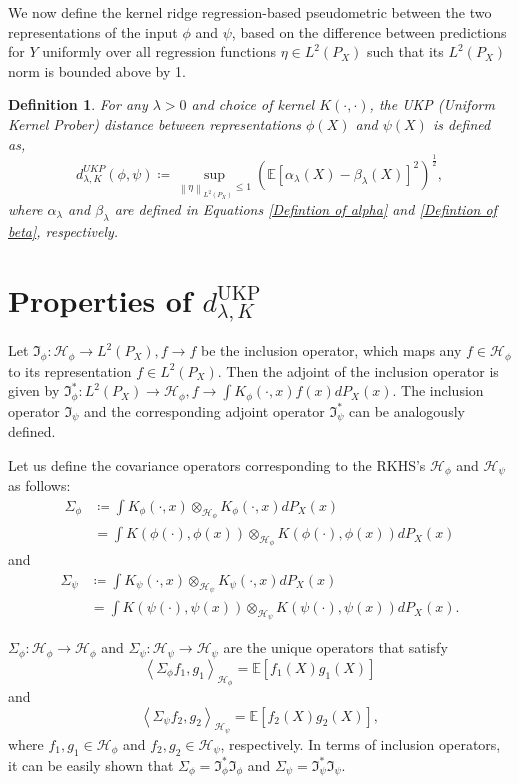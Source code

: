 \documentclass{article}
\theoremstyle{plain}
\newcounter{definitionno}
\newtheorem{definition}[definitionno]{Definition}
\newcommand{\E}{\mathbb{E}}
\newcommand{\I}{\mathfrak{I}}
\newcommand{\Hil}{\mathcal{H}}
\newcommand{\repone}{\phi}
\newcommand{\reptwo}{\psi}
\newcommand{\Hone}{\mathcal{H}_{\phi}}
\newcommand{\Htwo}{\mathcal{H}_{\psi}}
\newcommand{\norm}[1]{\left\|#1\right\|}
\newcommand{\inprod}[1]{\left \langle #1 \right\rangle}
\newcommand{\LPtwo}{L^{2}(P_{X})}
\newcommand{\metricstname}{UKP }
\newcommand{\metricfullname}{Uniform Kernel Prober}
\begin{document}
We now define the kernel ridge regression-based pseudometric between the two representations of the input $\repone$ and $\reptwo$, based on the difference between predictions for $Y$ uniformly over all regression functions $\eta \in \LPtwo$ such that its $\LPtwo$ norm is bounded above by 1.
\begin{definition}\label{Definition of pseudometric}
    For any $\lambda>0$ and choice of kernel $K(\cdot,\cdot)$, the \metricstname (\metricfullname) distance between representations $\repone(X)$ and $\reptwo(X)$ is defined as, 
    \[
    d_{\lambda,K}^{\metricstname}(\repone,\reptwo) \coloneq \underset{\norm{\eta}_{\LPtwo} \leq 1}{\sup} \left(\E\left[\alpha_{\lambda}(X)-\beta_{\lambda}(X)\right]^{2}\right)^{\frac{1}{2}},
    \]
    where $\alpha_{\lambda}$ and $\beta_{\lambda}$ are defined in Equations \eqref{Defintion of alpha} and \eqref{Defintion of beta}, respectively.
\end{definition}
\section{Properties of $d_{\lambda,K}^{\text{\metricstname}}$} \label{Properties}

Let $\I_{\repone}: \Hone \to \LPtwo, f \to f$ be the inclusion operator, which maps any $f \in \Hone$ to its representation $f \in \LPtwo$. Then the adjoint of the inclusion operator is given by $\I_{\repone}^{*}:\LPtwo \to \Hone, f \to \int K_{\repone}(\cdot,x)f(x)dP_{X}(x)$. The inclusion operator $\I_{\reptwo}$ and the corresponding adjoint operator $\I_{\reptwo}^{*}$ can be analogously defined. 

Let us define the covariance operators corresponding to the RKHS's $\Hone$ and $\Htwo$ as follows:
\[
\begin{aligned}
    \Sigma_{\repone} &\coloneq \int K_{\repone}(\cdot,x) \otimes_{\Hone}  K_{\repone}(\cdot,x) dP_{X}(x)\\ &= \int K(\repone(\cdot),\repone(x)) \otimes_{\Hone} K(\repone(\cdot),\repone(x)) dP_{X}(x)
\end{aligned}
\]
and 
\[
\begin{aligned}
    \Sigma_{\reptwo} &\coloneq \int K_{\reptwo}(\cdot,x) \otimes_{\Htwo}  K_{\reptwo}(\cdot,x) dP_{X}(x)\\ &= \int K(\reptwo(\cdot),\reptwo(x)) \otimes_{\Htwo} K(\reptwo(\cdot),\reptwo(x)) dP_{X}(x).
\end{aligned}
\]

$\Sigma_{\repone}: \Hil_{\repone} \to \Hil_{\repone}$ and $\Sigma_{\reptwo}: \Hil_{\reptwo} \to \Hil_{\reptwo}$ are the unique operators that satisfy 
\[
    \inprod{\Sigma_{\repone}f_{1},g_{1}}_{\Hone} = \E\left[f_{1}(X)g_{1}(X)\right]
\]
and
\[
    \inprod{\Sigma_{\reptwo}f_{2},g_{2}}_{\Htwo} = \E\left[f_{2}(X)g_{2}(X)\right],
\]
where $f_{1},g_{1} \in \Hone$ and $f_{2},g_{2} \in \Htwo$, respectively. In terms of inclusion operators, it can be easily shown that $\Sigma_{\repone} = \I_{\repone}^{*}\I_{\repone}$ and $\Sigma_{\reptwo} = \I_{\reptwo}^{*}\I_{\reptwo}$.
\end{document}
